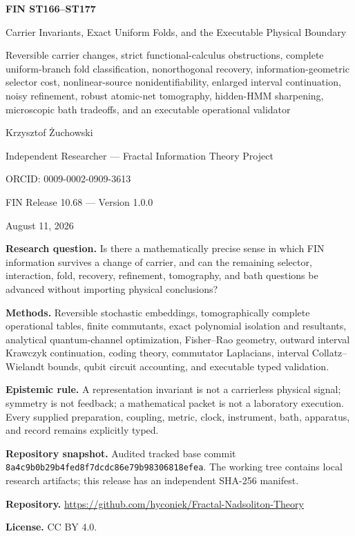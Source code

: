 \documentclass[11pt,a4paper]{article}
\begin{document}
\begin{titlepage}
\centering
\vspace*{0.75cm}
{\LARGE\bfseries FIN ST166--ST177\par}
\vspace{0.25cm}
{\Large Carrier Invariants, Exact Uniform Folds, and the Executable Physical Boundary\par}
\vspace{0.35cm}
{\large Reversible carrier changes, strict functional-calculus obstructions, complete uniform-branch fold classification, nonorthogonal recovery, information-geometric selector cost, nonlinear-source nonidentifiability, enlarged interval continuation, noisy refinement, robust atomic-net tomography, hidden-HMM sharpening, microscopic bath tradeoffs, and an executable operational validator\par}
\vspace{0.70cm}
{\Large Krzysztof \.{Z}uchowski\par}
\vspace{0.18cm}
{\large Independent Researcher --- Fractal Information Theory Project\par}
{\large ORCID: 0009-0002-0909-3613\par}
\vspace{0.50cm}
{\large FIN Release 10.68 --- Version 1.0.0\par}
{\large August 11, 2026\par}
\vfill
\begin{minipage}{0.92\textwidth}
\textbf{Research question.} Is there a mathematically precise sense in which FIN information survives a change of carrier, and can the remaining selector, interaction, fold, recovery, refinement, tomography, and bath questions be advanced without importing physical conclusions?\par
\textbf{Methods.} Reversible stochastic embeddings, tomographically complete operational tables, finite commutants, exact polynomial isolation and resultants, analytical quantum-channel optimization, Fisher--Rao geometry, outward interval Krawczyk continuation, coding theory, commutator Laplacians, interval Collatz--Wielandt bounds, qubit circuit accounting, and executable typed validation.\par
\textbf{Epistemic rule.} A representation invariant is not a carrierless physical signal; symmetry is not feedback; a mathematical packet is not a laboratory execution. Every supplied preparation, coupling, metric, clock, instrument, bath, apparatus, and record remains explicitly typed.\par
\textbf{Repository snapshot.} Audited tracked base commit \texttt{8a4c9b0b29b4fed8f7dcdc86e79b98306818efea}. The working tree contains local research artifacts; this release has an independent SHA-256 manifest.\par
\textbf{Repository.} \url{https://github.com/hyconiek/Fractal-Nadsoliton-Theory}\par
\textbf{License.} CC BY 4.0.
\end{minipage}
\end{titlepage}
\end{document}
